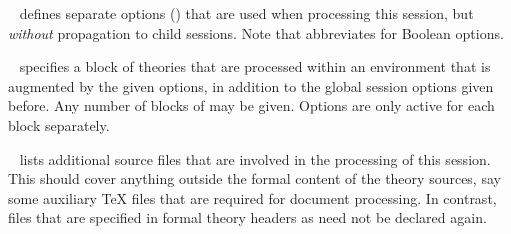 \begin{isabellebody}
\begin{isamarkuptext}
\begin{description}
  \item {}~ defines
  separate options () that are used when
  processing this session, but \emph{without} propagation to child
  sessions.  Note that  abbreviates  for
  Boolean options.

  \item {}~ specifies a
  block of theories that are processed within an environment that is
  augmented by the given options, in addition to the global session
  options given before.  Any number of blocks of 
  may be given.  Options are only active for each
   block separately.

  \item {}~ lists additional source
  files that are involved in the processing of this session.  This
  should cover anything outside the formal content of the theory
  sources, say some auxiliary {\TeX} files that are required for
  document processing.  In contrast, files that are specified in
  formal theory headers as \hyperlink{keyword.uses}{\mbox{}} need not be declared
  again.


\end{description}
\end{isamarkuptext}
\end{isabellebody}
